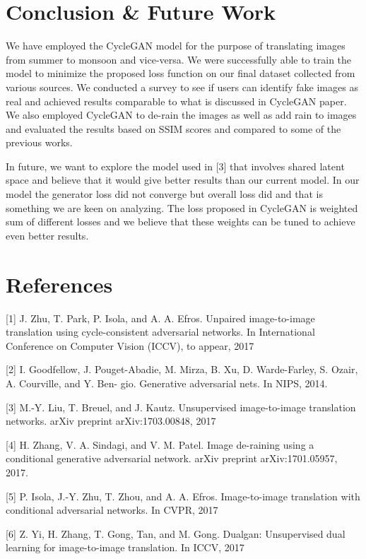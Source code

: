 \documentclass{article}
\begin{document}
\section{Conclusion \& Future Work}

We have employed the CycleGAN model for the purpose of translating images from summer to monsoon and vice-versa. We were successfully able to train the model to minimize the proposed loss function on our final dataset collected from various sources. We conducted a survey to see if users can identify fake images as real and achieved results comparable to what is discussed in CycleGAN paper. We also employed CycleGAN to de-rain the images as well as add rain to images and evaluated the results based on SSIM scores and compared to some of the previous works.

In future, we want to explore the model used in [3] that involves shared latent space and believe that it would give better results than our current model. In our model the generator loss did not converge but overall loss did and that is something we are keen on analyzing. The loss proposed in CycleGAN is weighted sum of different losses and we believe that these weights can be tuned to achieve even better results.

\section*{References}

\small
\label{[1]}[1] J. Zhu, T. Park, P. Isola, and A. A. Efros. Unpaired image-to-image 
translation using cycle-consistent adversarial networks. 
In International Conference on Computer Vision (ICCV), to appear, 2017

\label{[2]}[2] I. Goodfellow, J. Pouget-Abadie, M. Mirza, B. Xu, D. Warde-Farley, 
S. Ozair, A. Courville, and Y. Ben- gio. Generative adversarial nets. 
In NIPS, 2014.

\label{[3]}[3] M.-Y. Liu, T. Breuel, and J. Kautz. Unsupervised 
image-to-image translation networks. arXiv preprint arXiv:1703.00848, 2017

\label{[4]}[4] H. Zhang, V. A. Sindagi, and V. M. Patel. Image de-raining using a conditional generative 
adversarial network. arXiv preprint arXiv:1701.05957, 2017.

\label{[5]}[5] P. Isola, J.-Y. Zhu, T. Zhou, and A. A. Efros. 
Image-to-image translation with conditional adversarial networks. 
In CVPR, 2017

\label{[6]}[6] Z. Yi, H. Zhang, T. Gong, Tan, and M. Gong. Dualgan: 
Unsupervised dual learning for image-to-image translation. 
In ICCV, 2017
\end{document}
